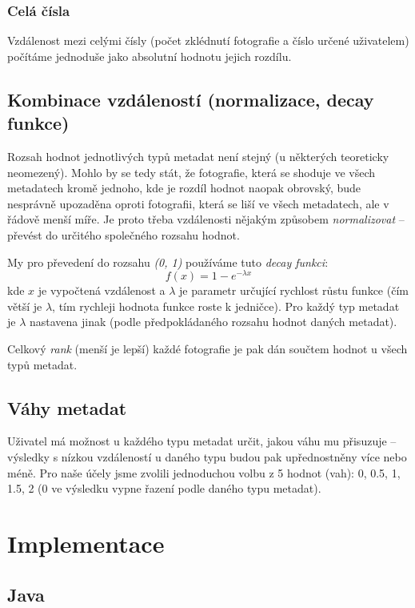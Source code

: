 \documentclass[12pt,oneside,a4paper]{article}
\begin{document}
\subsubsection{Celá čísla}
Vzdálenost mezi celými čísly (počet zklédnutí fotografie a číslo určené uživatelem) počítáme jednoduše jako absolutní hodnotu jejich rozdílu.

\subsection{Kombinace vzdáleností (normalizace, decay funkce)}
Rozsah hodnot jednotlivých typů metadat není stejný (u některých teoreticky neomezený). Mohlo by se tedy stát, že fotografie, která se shoduje ve všech metadatech kromě jednoho, kde je rozdíl hodnot naopak obrovský, bude nesprávně upozaděna oproti fotografii, která se liší ve všech metadatech, ale v řádově menší míře. Je proto třeba vzdálenosti nějakým způsobem \textit{normalizovat} -- převést do určitého společného rozsahu hodnot.

My pro převedení do rozsahu \textit{(0, 1)} používáme tuto \textit{decay funkci}:
\begin{equation}
	f(x) = 1 - e^{-\lambda x}
\end{equation}
kde \(x\) je vypočtená vzdálenost a \(\lambda\) je parametr určující rychlost růstu funkce (čím větší je \(\lambda\), tím rychleji hodnota funkce roste k jedničce). Pro každý typ metadat je \(\lambda\) nastavena jinak (podle předpokládaného rozsahu hodnot daných metadat).

Celkový \textit{rank} (menší je lepší) každé fotografie je pak dán součtem hodnot u všech typů metadat.

\subsection{Váhy metadat}
Uživatel má možnost u každého typu metadat určit, jakou váhu mu přisuzuje -- výsledky s nízkou vzdáleností u daného typu budou pak upřednostněny více nebo méně. Pro naše účely jsme zvolili jednoduchou volbu z 5 hodnot (vah): 0, 0.5, 1, 1.5, 2 (0 ve výsledku vypne řazení podle daného typu metadat).

\section{Implementace}

\subsection{Java}
\end{document}
